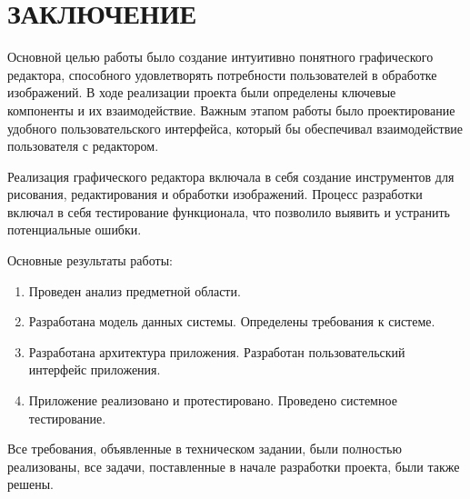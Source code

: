 \section*{ЗАКЛЮЧЕНИЕ}

Основной целью работы было создание интуитивно понятного графического редактора, способного удовлетворять потребности пользователей в обработке изображений. В ходе реализации проекта были определены ключевые компоненты и их взаимодействие. Важным этапом работы было проектирование удобного пользовательского интерфейса, который бы обеспечивал взаимодействие пользователя с редактором.

Реализация графического редактора включала в себя создание инструментов для рисования, редактирования и обработки изображений. Процесс разработки включал в себя тестирование функционала, что позволило выявить и устранить потенциальные ошибки.

Основные результаты работы:

\begin{enumerate}
\item Проведен анализ предметной области.
\item Разработана модель данных системы. Определены требования к системе.
\item Разработана архитектура приложения. Разработан пользовательский интерфейс приложения.
\item Приложение реализовано и протестировано. Проведено системное тестирование.
\end{enumerate}

Все требования, объявленные в техническом задании, были полностью реализованы, все задачи, поставленные в начале разработки проекта, были также решены.
